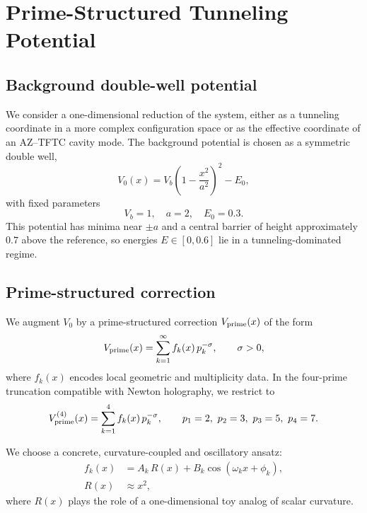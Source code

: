 \documentclass[11pt]{article}
\begin{document}
\section{Prime-Structured Tunneling Potential}

\subsection{Background double-well potential}

We consider a one-dimensional reduction of the system, either as a
tunneling coordinate in a more complex configuration space or as the
effective coordinate of an AZ--TFTC cavity mode.\cite{tunneling_topology_draft}
The background potential is chosen as a symmetric double well,
\begin{equation}
  V_0(x) = V_b\left(1 - \frac{x^2}{a^2}\right)^2 - E_0,
  \label{eq:double_well}
\end{equation}
with fixed parameters
\begin{equation}
  V_b = 1,\quad a = 2,\quad E_0 = 0.3.
\end{equation}
This potential has minima near \(\pm a\) and a central barrier of
height approximately \(0.7\) above the reference, so energies
\(E\in[0,0.6]\) lie in a tunneling-dominated regime.

\subsection{Prime-structured correction}

We augment \(V_0\) by a prime-structured correction
\(V_{\rm prime}(x)\) of the form
\begin{equation}
  V_{\rm prime}(x) = \sum_{k=1}^\infty f_k(x)\,p_k^{-\sigma},
  \qquad \sigma>0,
  \label{eq:Vprime_general}
\end{equation}
where \(f_k(x)\) encodes local geometric and multiplicity data.\cite{tunneling_topology_draft}
In the four-prime truncation compatible with Newton holography, we
restrict to
\begin{equation}
  V_{\rm prime}^{(4)}(x) = \sum_{k=1}^{4} f_k(x)\,p_k^{-\sigma},
  \qquad p_1=2,\ p_2=3,\ p_3=5,\ p_4=7.
  \label{eq:Vprime_4}
\end{equation}

We choose a concrete, curvature-coupled and oscillatory ansatz:
\begin{align}
  f_k(x) &= A_k\,R(x) + B_k \cos(\omega_k x + \phi_k),
  \label{eq:fk_def} \\
  R(x) &\approx x^2,
\end{align}
where \(R(x)\) plays the role of a one-dimensional toy analog of scalar
curvature.\cite{tunneling_topology_draft}
\end{document}
